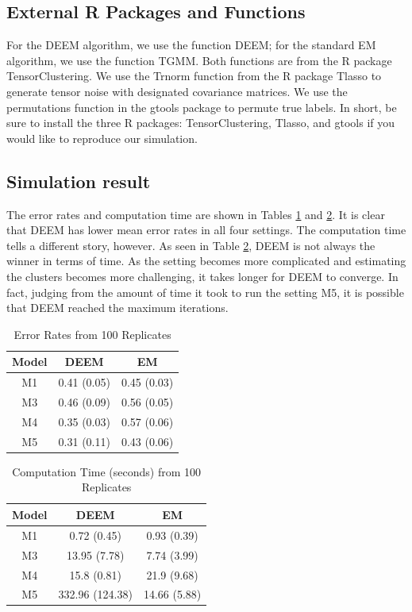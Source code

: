 \documentclass[11pt]{article}
\begin{document}
\subsection{External R Packages and Functions}

For the DEEM algorithm, we use the function DEEM; for the standard EM algorithm, we use the function TGMM. Both functions are from the R package TensorClustering. We use the Trnorm function from the R package Tlasso to generate tensor noise with designated covariance matrices. We use the permutations function in the gtools package to permute true labels. In short, be sure to install the three R packages: TensorClustering, Tlasso, and gtools if you would like to reproduce our simulation. 


\subsection{Simulation result}

The error rates and computation time are shown in Tables \ref{tab:err} and \ref{tab:time}. It is clear that DEEM has lower mean error rates in all four settings. The computation time tells a different story, however. As seen in Table \ref{tab:time}, DEEM is not always the winner in terms of time. As the setting becomes more complicated and estimating the clusters becomes more challenging, it takes longer for DEEM to converge. In fact, judging from the amount of time it took to run the setting M5, it is possible that DEEM reached the maximum iterations. 

\begin{table}[H]
    \centering
    \begin{tabular}{c|cc}
       Model  &  DEEM & EM \\
       \hline
         M1 & 0.41 (0.05) & 0.45 (0.03) \\
         M3 &  0.46 (0.09) & 0.56 (0.05) \\
         M4 &  0.35 (0.03) & 0.57 (0.06) \\ 
         M5 &  0.31 (0.11) & 0.43 (0.06) \\
    \end{tabular}
    \caption{Error Rates from 100 Replicates}
    \label{tab:err}
\end{table}

\begin{table}[H]
    \centering
    \begin{tabular}{c|cc}
       Model  &  DEEM & EM \\
       \hline
         M1 & 0.72 (0.45) & 0.93 (0.39) \\
         M3 &  13.95 (7.78) & 7.74 (3.99) \\
         M4 &  15.8 (0.81) & 21.9 (9.68) \\ 
         M5 &  332.96 (124.38) & 14.66 (5.88) \\
    \end{tabular}
    \caption{Computation Time (seconds) from 100 Replicates}
    \label{tab:time}
\end{table}
\end{document}
